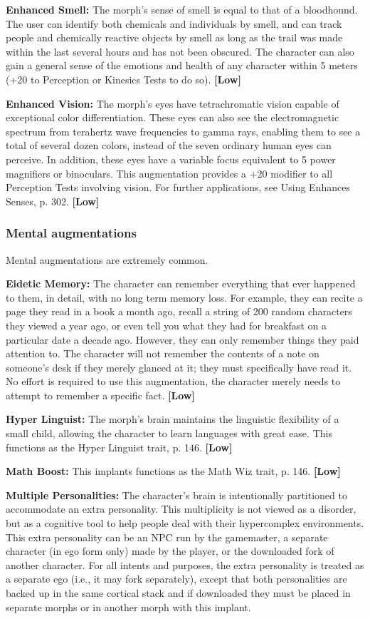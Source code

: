 \textbf{Enhanced Smell:} The morph’s sense of smell is equal to that of a bloodhound. The user can identify both chemicals and individuals by smell, and can track people and chemically reactive objects by smell as long as the trail was made within the last several hours and has not been obscured. The character can also gain a general sense of the emotions and health of any character within 5 meters (+20 to Perception or Kinesics Tests to do so). \textbf{[Low]}

\textbf{Enhanced Vision:} The morph’s eyes have tetrachromatic vision capable of exceptional color differentiation. These eyes can also see the electromagnetic spectrum from terahertz wave frequencies to gamma rays, enabling them to see a total of several dozen colors, instead of the seven ordinary human eyes can perceive. In addition, these eyes have a variable focus equivalent to 5 power magnifiers or binoculars. This augmentation provides a +20 modifier to all Perception Tests involving vision. For further applications, see Using Enhances Senses, p. 302. \textbf{[Low]}

\subsubsection{Mental augmentations}

Mental augmentations are extremely common.

\textbf{Eidetic Memory:} The character can remember everything that ever happened to them, in detail, with no long term memory loss. For example, they can recite a page they read in a book a month ago, recall a string of 200 random characters they viewed a year ago, or even tell you what they had for breakfast on a particular date a decade ago. However, they can only remember things they paid attention to. The character will not remember the contents of a note on someone’s desk if they merely glanced at it; they must specifically have read it. No effort is required to use this augmentation, the character merely needs to attempt to remember a specific fact. \textbf{[Low]}

\textbf{Hyper Linguist:} The morph’s brain maintains the linguistic flexibility of a small child, allowing the character to learn languages with great ease. This functions as the Hyper Linguist trait, p. 146. \textbf{[Low]}

\textbf{Math Boost:} This implants functions as the Math Wiz trait, p. 146. \textbf{[Low]}

\textbf{Multiple Personalities:} The character’s brain is intentionally partitioned to accommodate an extra personality. This multiplicity is not viewed as a disorder, but as a cognitive tool to help people deal with their hypercomplex environments. This extra personality can be an NPC run by the gamemaster, a separate character (in ego form only) made by the player, or the downloaded fork of another character. For all intents and purposes, the extra personality is treated as a separate ego (i.e., it may fork separately), except that both personalities are backed up in the same cortical stack and if downloaded they must be placed in separate morphs or in another morph with this implant.

